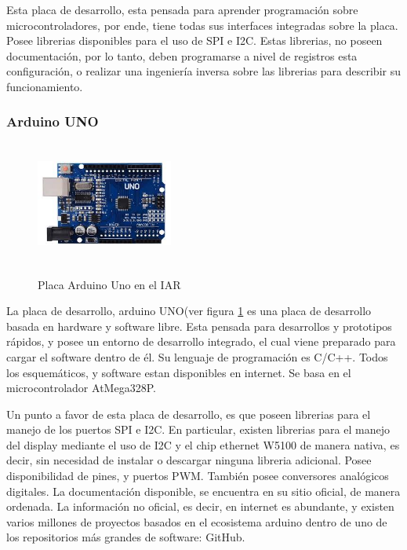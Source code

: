 Esta placa de desarrollo, esta pensada para aprender programación sobre microcontroladores, por ende, tiene todas sus interfaces integradas sobre la placa. Posee librerias disponibles para el uso de SPI e I2C. Estas librerias, no poseen documentación, por lo tanto, deben programarse a nivel de registros esta configuración, o realizar una ingeniería inversa sobre las librerias para describir su funcionamiento.    
\vspace{-3mm}

\subsubsection{Arduino UNO }
\vspace{-5mm}
\begin{figure}
	\caption{Placa Arduino Uno en el IAR}
	\includegraphics[width=0.4\textwidth , height=  40mm]{arduino_uno}
	\label{fig:arduino_uno}	
\end{figure}




La placa de desarrollo, arduino UNO(ver figura \ref{fig:arduino_uno} es una placa de desarrollo basada en hardware y software libre. Esta pensada para desarrollos y prototipos rápidos, y posee un entorno de desarrollo integrado, el cual viene preparado para cargar el software dentro de él. Su lenguaje de programación es C/C++. Todos los esquemáticos, y software estan disponibles en internet. Se basa en el microcontrolador AtMega328P.  

Un punto a favor de esta placa de desarrollo, es que poseen librerias para el manejo de los puertos SPI e I2C. En particular, existen librerias para el manejo del display mediante el uso de I2C y el chip ethernet W5100 de manera nativa, es decir, sin necesidad de instalar o descargar ninguna libreria adicional. Posee disponibilidad de pines,  y puertos PWM. También posee conversores analógicos digitales. La documentación disponible, se encuentra en su sitio oficial, de manera ordenada. 
La información no oficial, es decir, en internet es abundante, y existen varios millones de proyectos basados en el ecosistema arduino dentro de uno de los repositorios más grandes de software: GitHub.    

